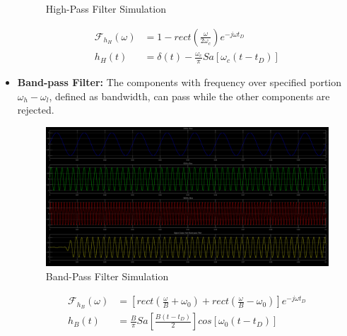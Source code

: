 \documentclass[margin,line]{res}
\begin{document}
\begin{resume}
\begin{itemize}
\begin{minipage}{0.5\linewidth}
\begin{figure}[H]
			\caption*{High-Pass Filter Simulation}
		\end{figure}	
	\end{minipage}
	\begin{minipage}{0.5\linewidth}
		\begin{align}
			\mathscr{F}_{h_H}(\omega) &= 1-rect(\frac{\omega}{2\omega_c}) e^{-j\omega t_D} \nonumber \\
			h_H(t) &= \delta (t)-\frac{\omega_c}{\pi}Sa\left[ \omega_c(t-t_D) \right] \nonumber
		\end{align}
	\end{minipage}
	\item \textbf{Band-pass Filter:} The components with frequency over specified portion $\omega_h - \omega_l$, defined as bandwidth, can pass while the other components are rejected. \par
	\begin{minipage}{0.5\linewidth}
		\begin{figure}[H]
			\centering
			\includegraphics[width=0.9\linewidth]{figure/filter/Band-pass}
			\caption*{Band-Pass Filter Simulation}
		\end{figure}	
	\end{minipage}
	\begin{minipage}{0.5\linewidth}
		\begin{align}
			\mathscr{F}_{h_B}(\omega) &= \left[ rect\left(\frac{\omega}{B}+\omega_0\right) +rect\left(\frac{\omega}{B}-\omega_0\right) \right] e^{-j\omega t_D} \nonumber \\
			h_B(t) &= \frac{B}{\pi}Sa\left[ \frac{B(t-t_D)}{2} \right] cos\left[ \omega_0(t-t_D) \right] \nonumber
		\end{align}
	\end{minipage}
\end{itemize}


\end{resume}
\end{document}

